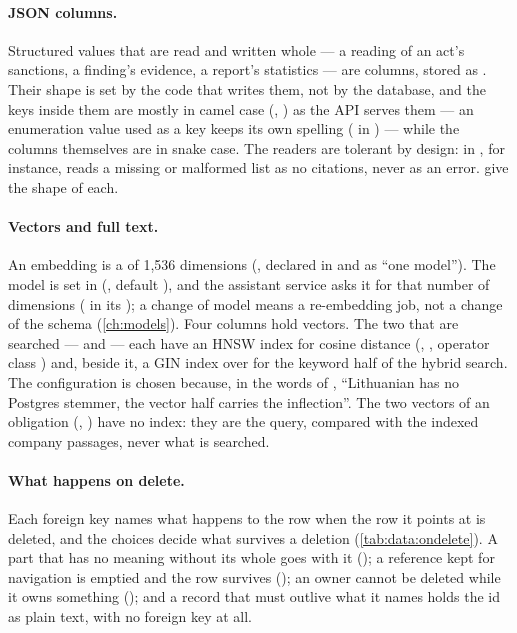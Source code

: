 \paragraph{JSON columns.} Structured values that are read and written whole --- a reading of
an act's sanctions, a finding's evidence, a report's statistics --- are 
columns, stored as . Their shape is set by the code that writes them, not by the
database, and the keys inside them are mostly in camel case (,
) as the API serves them --- an enumeration value used as a key keeps its
own spelling ( in ) --- while the columns themselves are
in snake case. The readers are
tolerant by design:  in , for instance,
reads a missing or malformed list as no citations, never as an error.
give the shape of each.

\paragraph{Vectors and full text.} An embedding is a  of 1,536 dimensions
(, declared in  and 
as \enquote{one model}). The model is set in  (, default
), and the assistant service asks it for that
number of dimensions ( in its ); a change of
model means a re-embedding job, not a change of the schema (\cref{ch:models}). Four columns
hold vectors. The two that are searched ---  and
 --- each have an HNSW index for cosine distance
(, , operator class ) and, beside
it, a GIN index over  for the keyword half of the hybrid
search. The  configuration is chosen because, in the words of
, \enquote{Lithuanian has no Postgres stemmer, the vector half carries
the inflection}. The two vectors of an obligation (, ) have
no index: they are the query, compared with the indexed company passages, never what is
searched.

\paragraph{What happens on delete.} Each foreign key names what happens to the row when the row
it points at is deleted, and the choices decide what survives a deletion
(\cref{tab:data:ondelete}). A part that has no meaning without its whole goes with it
(); a reference kept for navigation is emptied and the row survives
(); an owner cannot be deleted while it owns something (); and a
record that must outlive what it names holds the id as plain text, with no foreign key at all.

